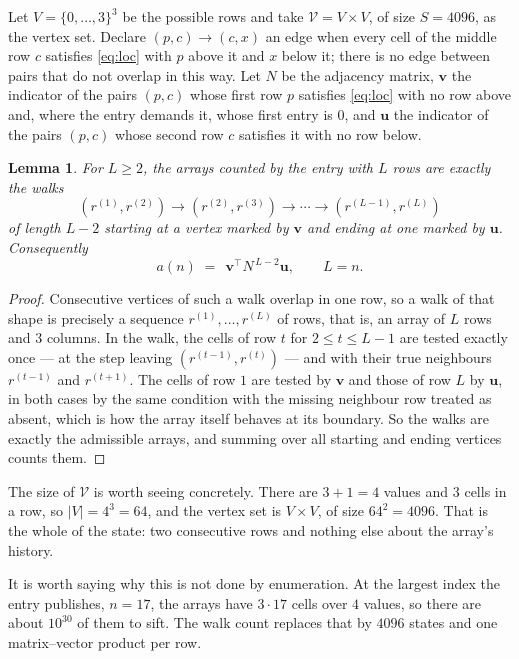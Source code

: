 \documentclass[11pt,a4paper]{article}
\theoremstyle{plain}
\newtheorem{lemma}[theorem]{Lemma}
\theoremstyle{definition}
\begin{document}
Let $V=\{0,\dots,3\}^{3}$ be the possible rows and take
$\mathcal V=V\times V$, of size $S=4096$, as the vertex set. Declare $(p,c)\to(c,x)$ an edge
when every cell of the middle row $c$ satisfies \eqref{eq:loc} with $p$ above it and $x$
below it; there is no edge between pairs that do not overlap in this way. Let $N$ be the
adjacency matrix, $\mathbf{v}$ the indicator of the pairs $(p,c)$ whose first row $p$
satisfies \eqref{eq:loc} with no row above and, where the entry demands it, whose first entry is $0$, and $\mathbf{u}$ the indicator of
the pairs $(p,c)$ whose second row $c$ satisfies it with no row below.

\begin{lemma}\label{lem:walk}
For $L\ge2$, the arrays counted by the entry with $L$ rows are exactly the walks
\[
(r^{(1)},r^{(2)})\to(r^{(2)},r^{(3)})\to\cdots\to(r^{(L-1)},r^{(L)})
\]
of length $L-2$ starting at a vertex marked by $\mathbf{v}$ and ending at one marked by
$\mathbf{u}$. Consequently
\[
a(n)\;=\;\,\mathbf{v}^{\!\top}N^{\,L-2}\mathbf{u},\qquad L=n .
\]
\end{lemma}

\begin{proof}
Consecutive vertices of such a walk overlap in one row, so a walk of that shape is
precisely a sequence $r^{(1)},\dots,r^{(L)}$ of rows, that is, an array of $L$ rows
and $3$ columns. In the walk, the cells of row $t$ for $2\le t\le L-1$ are tested
exactly once --- at the step leaving $(r^{(t-1)},r^{(t)})$ --- and with their true
neighbours $r^{(t-1)}$ and $r^{(t+1)}$. The cells of row $1$ are tested by
$\mathbf{v}$ and those of row $L$ by $\mathbf{u}$, in both cases by the same condition
with the missing neighbour row treated as absent, which is how the array itself behaves at
its boundary. So the walks are exactly the admissible arrays, and summing over all starting
and ending vertices counts them.
\end{proof}


The size of $\mathcal V$ is worth seeing concretely. There are $3+1=4$ values
and $3$ cells in a row, so $|V|=4^{3}=64$, and the vertex set is
$V\times V$, of size $64^2=4096$. That is the whole of the state: two consecutive
rows and nothing else about the array's history.

It is worth saying why this is not done by enumeration. At the largest index the entry
publishes, $n=17$, the arrays have $3\cdot17$ cells over
$4$ values, so there are about $10^{30}$ of them to sift. The
walk count replaces that by $4096$ states and one matrix--vector product per row.
\end{document}
